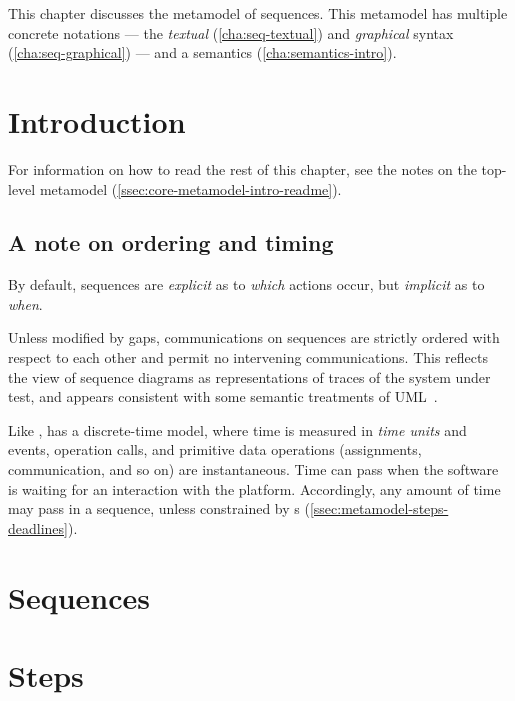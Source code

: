 

This chapter discusses the metamodel of \langname{} sequences.  This metamodel
has multiple concrete notations ---
the \emph{textual} (\cref{cha:seq-textual}) and \emph{graphical}
syntax (\cref{cha:seq-graphical}) --- and a semantics (\cref{cha:semantics-intro}). 

\section{Introduction}\label{sec:metamodel-intro}

For information on how to read the rest of this chapter, see the notes on
the top-level metamodel (\cref{ssec:core-metamodel-intro-readme}).

\subsection{A note on ordering and timing}\label{ssec:metamodel-intro-ordering}

By default, \langname{} sequences are \emph{explicit}
as to \emph{which} actions occur, but \emph{implicit} as to
\emph{when}.

Unless modified by gaps,
communications on \langname{} sequences are strictly ordered with
respect to each other and permit no intervening communications.  This
reflects the view of sequence diagrams as representations of traces of
the system under test, and appears consistent with some semantic
treatments of UML~\cite{lima-semantics}.  

Like \robochart, \langname{} has a discrete-time model, where time is
measured in \emph{time units} and events, operation calls, and
primitive data operations (assignments, communication, and so on) are
instantaneous.  Time can pass when the software is waiting for an
interaction with the platform.  Accordingly, any amount of time may
pass in a sequence, unless constrained by \mdeadlinestep s
(\cref{ssec:metamodel-steps-deadlines}).

\section{Sequences}\label{sec:metamodel-sequences}


\section{Steps}\label{sec:seq-metamodel-steps}


